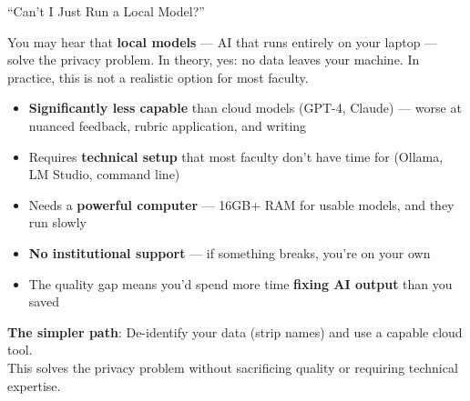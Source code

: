 \documentclass[aspectratio=169, 10pt]{beamer}
\begin{document}
\begin{frame}{``Can't I Just Run a Local Model?''}

\small
You may hear that \textbf{local models} --- AI that runs entirely on your laptop --- solve the privacy problem. In theory, yes: no data leaves your machine. In practice, this is not a realistic option for most faculty.

\vspace{0.2cm}

\begin{tcolorbox}[keybox, title={\faExclamationTriangle\quad Why local models aren't the answer (yet)}]
\footnotesize
\begin{itemize}
  \item \textbf{Significantly less capable} than cloud models (GPT-4, Claude) --- worse at nuanced feedback, rubric application, and writing
  \item Requires \textbf{technical setup} that most faculty don't have time for (Ollama, LM Studio, command line)
  \item Needs a \textbf{powerful computer} --- 16GB+ RAM for usable models, and they run slowly
  \item \textbf{No institutional support} --- if something breaks, you're on your own
  \item The quality gap means you'd spend more time \textbf{fixing AI output} than you saved
\end{itemize}
\end{tcolorbox}

\vspace{0.2cm}

\begin{tcolorbox}[accentbox]
\centering
\footnotesize\textbf{The simpler path}: De-identify your data (strip names) and use a capable cloud tool.\\[2pt]
This solves the privacy problem without sacrificing quality or requiring technical expertise.
\end{tcolorbox}

\end{frame}
\end{document}
